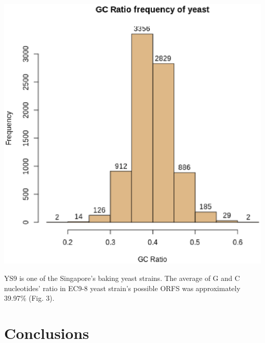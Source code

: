 \documentclass{article}
\begin{document}
\begin{minipage}{0.5\textwidth}
\includegraphics[width=\textwidth]{images/YS9_Stanford_2014_JRIB00000000.eps}
\end{minipage}
\begin{minipage}{0.5\textwidth}
YS9 is one of the Singapore's baking yeast strains.
The average of G and C nucleotides' ratio in EC9-8 yeast strain's possible ORFS was approximately 39.97\% (Fig. 3). 
\vspace{1cm}\\
\end{minipage}

\section{Conclusions}
\end{document}
